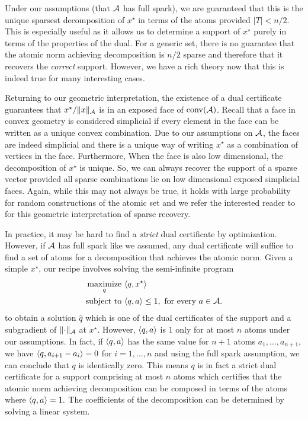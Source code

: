 Under our assumptions (that $\mathcal{A}$ has full spark), we are guaranteed that this is
the unique sparsest decomposition of $x^\star$ in terms of the atoms provided
$|T| < n/2$. This is especially useful as it allows us to determine a support of
$x^\star$ purely in terms of the properties of the dual. For a generic set,
there is no guarantee that the atomic norm achieving decomposition is $n/2$
sparse and therefore that it recovers the \emph{correct} support. However, we
have a rich theory now that this is indeed true for many interesting
cases\cite{donoho2006most,candes06,candes2005decoding}.

Returning to our geometric interpretation, the existence of a dual certificate
guarantees that $x^\star/\lVert x\rVert_{\mathcal{A}}$ is in an exposed face of $\operatorname{conv}(\mathcal{A})$.
Recall that a face in convex geometry is considered simplicial if every element
in the face can be written as a unique convex combination. Due to our
assumptions on $\mathcal{A}$, the faces are indeed simplicial and there is a unique way
of writing $x^\star$ as a combination of vertices in the face. Furthermore, When
the face is also low dimensional, the decomposition of $x^\star$ is unique. So,
we can always recover the support of a sparse vector provided all sparse
combinations lie on low dimensional exposed simplicial faces. Again, while this
may not always be true, it holds with large probability for random constructions
of the atomic set and we refer the interested reader to~\cite{neighborliness}
for this geometric interpretation of sparse recovery.

In practice, it may be hard to find a \emph{strict} dual certificate by
optimization. However, if $\mathcal{A}$ has full spark like we assumed, any dual
certificate will suffice to find a set of atoms for a decomposition that
achieves the atomic norm. Given a simple $x^\star$, our recipe involves solving
the semi-infinite program
\begin{equation}
\label{eq:ast:dual:support}
\begin{split}
	\mathop{\operatorname{maximize}}_q~ & \langle q, x^\star\rangle\\
	\text{subject to } & \langle q, a\rangle \leq 1, \text{ for every } a \in \mathcal{A}.
\end{split}
\end{equation}
to obtain a solution $\hat{q}$ which is one of the dual certificates of the
support and a subgradient of $\lVert\cdot\rVert_{\mathcal{A}}$ at $x^\star$. However,
$\langle q, a\rangle$ is $1$ only for at most $n$ atoms under our assumptions. In fact,
if $\langle q, a\rangle$ has the same value for $n+1$ atoms $a_1, \dots, a_{n+1}$, we
have $\langle q, a_{i+1}-a_i\rangle = 0$ for $i=1,\ldots,n$ and using the full spark
assumption, we can conclude that $q$ is identically zero. This means $q$ is in
fact a strict dual certificate for a support comprising at most $n$ atoms which
certifies that the atomic norm achieving decomposition can be composed in terms
of the atoms where $\langle q, a\rangle=1.$ The coefficients of the decomposition can be
determined by solving a linear system.

